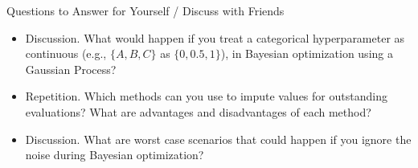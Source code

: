 \begin{frame}[c]{Questions to Answer for Yourself / Discuss with Friends}

\begin{itemize}
\item \alert{Discussion.} What would happen if you treat a categorical hyperparameter as continuous (e.g., $\{A, B, C\}$ as $\{0, 0.5, 1\}$), in Bayesian optimization using a Gaussian Process?
\medskip
\item \alert{Repetition.} Which methods can you use to impute values for outstanding evaluations? What are advantages and disadvantages of each method?
\medskip
\item \alert{Discussion.} What are worst case scenarios that could happen if you ignore the noise during Bayesian optimization?
\end{itemize}
\end{frame}
